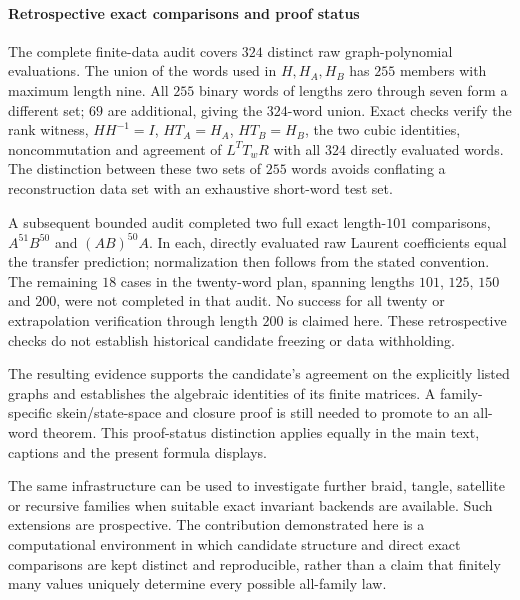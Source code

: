 \paragraph{Retrospective exact comparisons and proof status}
\label{supp:transfer_nonabelian_verification}
The complete finite-data audit covers $324$ distinct raw graph-polynomial evaluations. The union of the words used in $H,H_A,H_B$ has $255$ members with maximum length nine. All $255$ binary words of lengths zero through seven form a different set; $69$ are additional, giving the $324$-word union. Exact checks verify the rank witness, $HH^{-1}=I$, $HT_A=H_A$, $HT_B=H_B$, the two cubic identities, noncommutation and agreement of $L^TT_wR$ with all $324$ directly evaluated words. The distinction between these two sets of $255$ words avoids conflating a reconstruction data set with an exhaustive short-word test set.

A subsequent bounded audit completed two full exact length-$101$ comparisons, $A^{51}B^{50}$ and $(AB)^{50}A$. In each, directly evaluated raw Laurent coefficients equal the transfer prediction; normalization then follows from the stated convention. The remaining $18$ cases in the twenty-word plan, spanning lengths $101$, $125$, $150$ and $200$, were not completed in that audit. No success for all twenty or extrapolation verification through length $200$ is claimed here. These retrospective checks do not establish historical candidate freezing or data withholding.

The resulting evidence supports the candidate's agreement on the explicitly listed graphs and establishes the algebraic identities of its finite matrices. A family-specific skein/state-space and closure proof is still needed to promote  to an all-word theorem. This proof-status distinction applies equally in the main text, captions and the present formula displays.

The same infrastructure can be used to investigate further braid, tangle, satellite or recursive families when suitable exact invariant backends are available. Such extensions are prospective. The contribution demonstrated here is a computational environment in which candidate structure and direct exact comparisons are kept distinct and reproducible, rather than a claim that finitely many values uniquely determine every possible all-family law.
